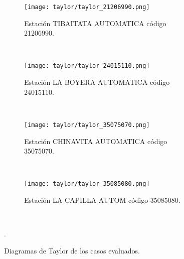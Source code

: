 \begin{figure}[H]\ContinuedFloat
\centering
\begin{subfigure}[normla]{0.4\textwidth}
\texttt{[image: taylor/taylor\_21206990.png]}
\caption{Estación TIBAITATA AUTOMATICA código 21206990.}
\end{subfigure}
~
\begin{subfigure}[normla]{0.4\textwidth}
\texttt{[image: taylor/taylor\_24015110.png]}
\caption{Estación LA BOYERA AUTOMATICA código 24015110.}
\end{subfigure}
~
\begin{subfigure}[normla]{0.4\textwidth}
\texttt{[image: taylor/taylor\_35075070.png]}
\caption{Estación CHINAVITA AUTOMATICA código 35075070.}
\end{subfigure}
~
\begin{subfigure}[normla]{0.4\textwidth}
\texttt{[image: taylor/taylor\_35085080.png]}
\caption{Estación LA CAPILLA AUTOM código 35085080.}
\end{subfigure}
~

	
	\caption{Diagramas de Taylor de los casos evaluados.}.
	 \label{gra:papa_cund}
\end{figure}
